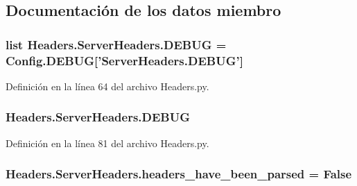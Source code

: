 \subsection{Documentación de los datos miembro}
\hypertarget{class_headers_1_1_server_headers_ad40c20e30870b97f13fb6c1b7c26901b}{
\subsubsection[{D\-E\-B\-U\-G}]{\setlength{\rightskip}{0pt plus 5cm}list Headers.\-Server\-Headers.\-D\-E\-B\-U\-G = Config.\-D\-E\-B\-U\-G\mbox{[}'Server\-Headers.\-D\-E\-B\-U\-G'\mbox{]}\hspace{0.3cm}{\ttfamily [static]}}}\label{class_headers_1_1_server_headers_ad40c20e30870b97f13fb6c1b7c26901b}


Definición en la línea 64 del archivo Headers.\-py.

\hypertarget{class_headers_1_1_server_headers_a44a103ed7dd322396cbc0f403ae16c35}{
\subsubsection[{D\-E\-B\-U\-G}]{\setlength{\rightskip}{0pt plus 5cm}Headers.\-Server\-Headers.\-D\-E\-B\-U\-G}}\label{class_headers_1_1_server_headers_a44a103ed7dd322396cbc0f403ae16c35}


Definición en la línea 81 del archivo Headers.\-py.

\hypertarget{class_headers_1_1_server_headers_af28d4aadceaef21602f69df4be674b47}{
\subsubsection[{headers\-\_\-have\-\_\-been\-\_\-parsed}]{\setlength{\rightskip}{0pt plus 5cm}Headers.\-Server\-Headers.\-headers\-\_\-have\-\_\-been\-\_\-parsed = False\hspace{0.3cm}{\ttfamily [static]}}}\label{class_headers_1_1_server_headers_af28d4aadceaef21602f69df4be674b47}


